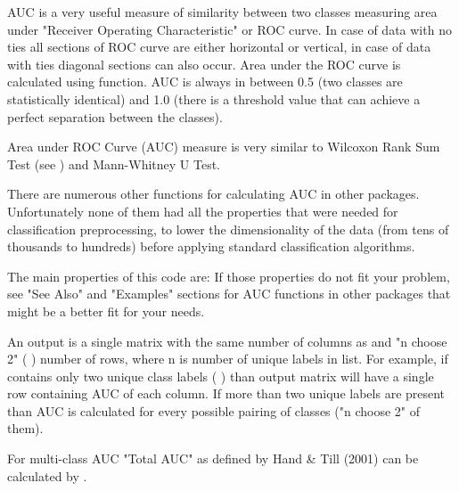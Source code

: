 \begin{Details}\relax
AUC is a very useful measure of similarity between two classes measuring area
under "Receiver Operating Characteristic" or ROC curve.
In case of data with no ties all sections of ROC curve are either horizontal
or vertical, in case of data with ties diagonal 
sections can also occur. Area under the ROC curve is calculated using 
 function. AUC is always in between 0.5 
(two classes are statistically identical) and 1.0 (there is a threshold value
that can achieve a perfect separation between the classes).

Area under ROC Curve (AUC) measure is very similar to Wilcoxon Rank Sum Test 
(see ) and Mann-Whitney U Test. 

There are numerous other functions for calculating AUC in other packages. 
Unfortunately none of them had all the properties that were needed for 
classification preprocessing, to lower the dimensionality of the data (from 
tens of thousands to hundreds) before applying standard classification 
algorithms. 

The main properties of this code are: 
If those properties do not fit your problem, see "See Also" and "Examples" 
sections for AUC 
functions in other packages that might be a better fit for your needs.
\end{Details}
\begin{Value}
An output is a single matrix with the same number of columns as  and 
"n choose 2" (  )
number of rows, 
where n is number of unique labels in  list. For example, if  
contains only two unique class labels (  ) than
output 
matrix will  have a single row containing AUC of each column. If more than 
two unique labels are present than AUC is calculated for every possible 
pairing of classes ("n choose 2" of them).

For multi-class AUC "Total AUC" as defined by Hand \& Till (2001) can be 
calculated by .
\end{Value}
